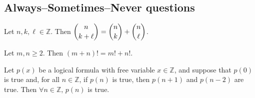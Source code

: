 \subsection*{Always--Sometimes--Never questions}


\begin{chapex} %
\label{cqInductionASNBegin}
Let $n,k,\ell \in \mathbb{Z}$. Then $\dbinom{n}{k+\ell} = \dbinom{n}{k} + \dbinom{n}{\ell}$.
\end{chapex}

\begin{chapex} %
Let $m,n \ge 2$. Then $(m+n)! = m!+n!$.
\end{chapex}

\begin{chapex} %
\label{cqInductionASNEnd}
Let $p(x)$ be a logical formula with free variable $x \in \mathbb{Z}$, and suppose that $p(0)$ is true and, for all $n \in \mathbb{Z}$, if $p(n)$ is true, then $p(n+1)$ and $p(n-2)$ are true. Then $\forall n \in \mathbb{Z},\, p(n)$ is true.
\end{chapex}